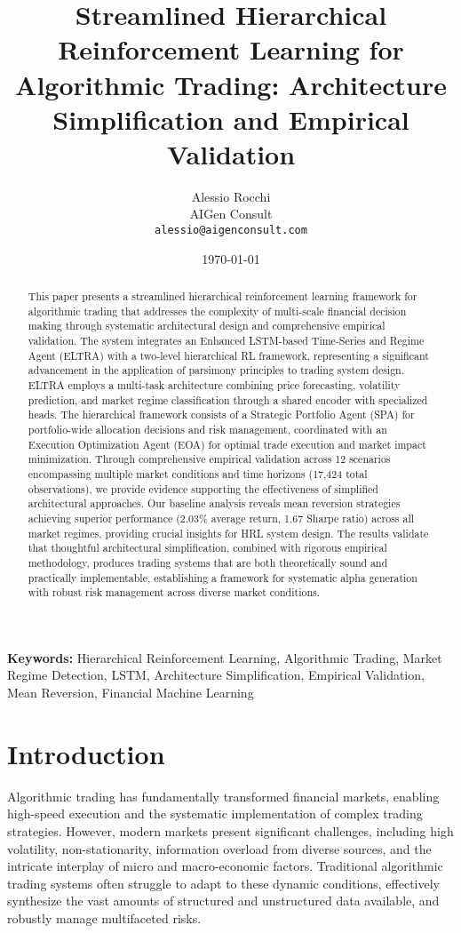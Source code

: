\documentclass[11pt,a4paper]{article}
\title{Streamlined Hierarchical Reinforcement Learning for Algorithmic Trading: Architecture Simplification and Empirical Validation}
\author{Alessio Rocchi\\
AIGen Consult\\
\texttt{alessio@aigenconsult.com}}
\date{\today}
\begin{document}
\maketitle

\begin{abstract}
This paper presents a streamlined hierarchical reinforcement learning framework for algorithmic trading that addresses the complexity of multi-scale financial decision making through systematic architectural design and comprehensive empirical validation. The system integrates an Enhanced LSTM-based Time-Series and Regime Agent (ELTRA) with a two-level hierarchical RL framework, representing a significant advancement in the application of parsimony principles to trading system design. ELTRA employs a multi-task architecture combining price forecasting, volatility prediction, and market regime classification through a shared encoder with specialized heads. The hierarchical framework consists of a Strategic Portfolio Agent (SPA) for portfolio-wide allocation decisions and risk management, coordinated with an Execution Optimization Agent (EOA) for optimal trade execution and market impact minimization. Through comprehensive empirical validation across 12 scenarios encompassing multiple market conditions and time horizons (17,424 total observations), we provide evidence supporting the effectiveness of simplified architectural approaches. Our baseline analysis reveals mean reversion strategies achieving superior performance (2.03\% average return, 1.67 Sharpe ratio) across all market regimes, providing crucial insights for HRL system design. The results validate that thoughtful architectural simplification, combined with rigorous empirical methodology, produces trading systems that are both theoretically sound and practically implementable, establishing a framework for systematic alpha generation with robust risk management across diverse market conditions.
\end{abstract}

\textbf{Keywords:} Hierarchical Reinforcement Learning, Algorithmic Trading, Market Regime Detection, LSTM, Architecture Simplification, Empirical Validation, Mean Reversion, Financial Machine Learning

\section{Introduction}

Algorithmic trading has fundamentally transformed financial markets, enabling high-speed execution and the systematic implementation of complex trading strategies. However, modern markets present significant challenges, including high volatility, non-stationarity, information overload from diverse sources, and the intricate interplay of micro and macro-economic factors. Traditional algorithmic trading systems often struggle to adapt to these dynamic conditions, effectively synthesize the vast amounts of structured and unstructured data available, and robustly manage multifaceted risks.
\end{document}
